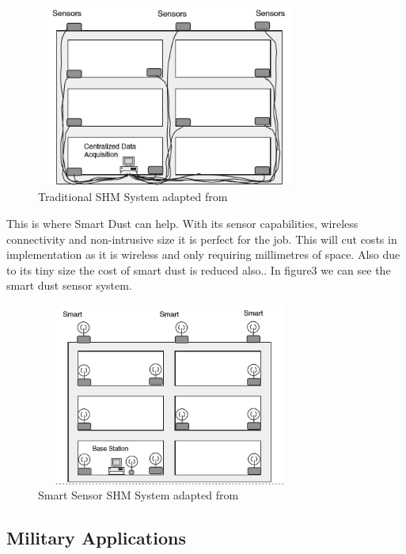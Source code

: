 \documentclass[article]{IEEEtran}
\begin{document}
\begin{figure}[h!]
\graphicspath{ {images/} }
\includegraphics[width=8.8cm, height=6cm]{figure2}
\caption{Traditional SHM System adapted from \cite{SHM}}
\label{Tradition SHM}
\end{figure}

This is where Smart Dust can help. With its sensor capabilities, wireless connectivity and non-intrusive size it is perfect for the job. This will cut costs in implementation as it is wireless and only requiring millimetres of space. Also due to its tiny size the cost of smart dust is reduced also.\cite{SHM}. In figure3 we can see the smart dust sensor system.

\begin{figure}[h!]
\graphicspath{ {images/} }
\includegraphics[width=8.8cm, height=6cm]{figure3}
\caption{Smart Sensor SHM System adapted from \cite{SHM}}
\end{figure}

\subsection{Military Applications}
\end{document}
